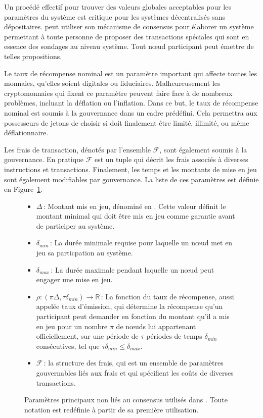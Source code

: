 \documentclass[runningheads,francais,a4paper]{llncs}
\begin{document}
Un procédé effectif pour trouver des valeurs globales acceptables pour les paramètres du système est critique pour les
systèmes décentralisés sans dépositaires. \AVAPlatformName{} peut utiliser son mécanisme de consensus pour élaborer un
système permettant à toute personne de proposer des transactions spéciales qui sont en essence des sondages au niveau
système. Tout nœud participant peut émettre de telles propositions.

Le taux de récompense nominal est un paramètre important qui affecte toutes les monnaies, qu'elles soient digitales ou
fiduciaires. Malheureusement les cryptomonnaies qui fixent ce paramètre peuvent faire face à de nombreux problèmes,
incluant la déflation ou l'inflation. Dans ce but, le taux de récompense nominal est soumis à la gouvernance dans un
cadre prédéfini. Cela permettra aux possesseurs de jetons de choisir si \AVATokenName{} doit finalement être limité,
illimité, ou même déflationnaire.

Les frais de transaction, dénotés par l'ensemble $\mathcal{F}$, sont également soumis à la gouvernance. En pratique
$\mathcal{F}$ est un tuple qui décrit les frais associés à diverses instructions et transactions. Finalement, les temps
et les montants de mise en jeu sont également modifiables par gouvernance. La liste de ces paramètres est définie en
Figure~\ref{fig:notation}.

\begin{figure}[hbtp]
\begin{framed}
\begin{itemize}
\item{$\Delta$}\,: Montant mis en jeu, dénominé en \AVATokenName. Cette valeur définit le montant minimal qui doit être
mis en jeu comme garantie avant de participer au système.
\item{$\delta_{min}$}\,: La durée minimale requise pour laquelle un nœud met en jeu sa particpation au système.
\item{$\delta_{max}$}\,: La durée maximale pendant laquelle un nœud peut engager une mise en jeu.
\item{$\rho: (\pi\Delta,\tau\delta_{min}) \rightarrow \mathbb{R}$}\,: La fonction du taux de récompense, aussi appelée
taux d'émission, qui détermine la récompense qu'un participant peut demander en fonction du montant qu'il a mis en jeu
pour un nombre $\pi$ de nœuds lui appartenant officiellement, sur une période de $\tau$ périodes de temps
$\delta_{min}$ consécutives, tel que $\tau\delta_{min} \leq \delta_{max}$.
\item{$\mathcal{F}$}\,: la structure des frais, qui est un ensemble de paramètres gouvernables liés aux frais et qui
spécifient les coûts de diverses transactions.
\end{itemize}
\end{framed}
\caption{Paramètres principaux non liés au consensus utilisés dans \AVAPlatformName{}. Toute notation est redéfinie à
partir de sa première utilisation.}
\label{fig:notation}
\end{figure}
\end{document}
